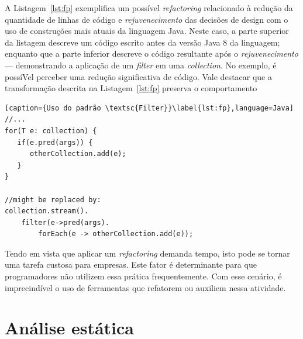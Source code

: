
A Listagem~\ref{lst:fp} exemplifica um possível \emph{refactoring} relacionado \`{a} 
redução da quantidade de linhas de código e \emph{rejuvenecimento} 
das decisões de design com o uso de construções mais atuais da 
linguagem Java. Neste caso, a parte superior da listagem descreve um código 
escrito antes da versão Java 8 da linguagem; enquanto que a parte inferior descreve o 
código resultante após o \emph{rejuvenecimento}--- demonstrando a   
aplicação de um {\it filter} em uma {\it collection}. No exemplo, é  
possíVel perceber uma redução significativa de código. 
Vale destacar que a transformação descrita
na Listagem~\ref{lst:fp} preserva o comportamento


\begin{lstlisting}[caption={Uso do padrão \textsc{Filter}}\label{lst:fp},language=Java] 
//...
for(T e: collection) {
   if(e.pred(args)) {
      otherCollection.add(e);
   }
}

//might be replaced by:
collection.stream().
	filter(e->pred(args).
		forEach(e -> otherCollection.add(e));
\end{lstlisting}




Tendo em vista que aplicar um \textit{refactoring} demanda tempo, 
isto pode se tornar uma tarefa custosa para empresas. Este fator é determinante 
para que programadores não utilizem essa prática frequentemente. Com esse 
cenário, é imprecindível o uso de ferramentas que refatorem ou auxiliem 
nessa atividade. 


\section{Análise estática}\label{sec:as}

